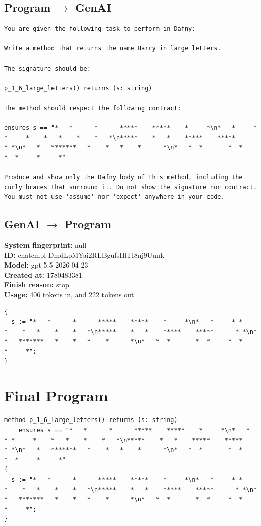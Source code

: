 \documentclass{article}
\begin{document}
\subsection*{Program $\rightarrow$ GenAI}
\begin{lstlisting}
You are given the following task to perform in Dafny:

Write a method that returns the name Harry in large letters.

The signature should be:

p_1_6_large_letters() returns (s: string)

The method should respect the following contract:

ensures s == "*   *      *      *****    *****    *     *\n*   *     * *     *    *   *    *    *   *\n*****    *   *    *****    *****      * *\n*   *   *******   *    *   *    *      *\n*   *  *       *  *     *  *     *     *"

Produce and show only the Dafny body of this method, including the curly braces that surround it. Do not show the signature nor contract. You must not use 'assume' nor 'expect' anywhere in your code.
\end{lstlisting}
\subsection*{GenAI $\rightarrow$ Program}
\textbf{System fingerprint: }null
\\\textbf{ID: }chatcmpl-DmdLpMYai2RLBgufsHlTI8nj9Uunk
\\\textbf{Model: }gpt-5.5-2026-04-23
\\\textbf{Created at: }1780483381
\\\textbf{Finish reason: }stop
\\\textbf{Usage: }406 tokens in, and 222 tokens out
\begin{lstlisting}
{
  s := "*   *      *      *****    *****    *     *\n*   *     * *     *    *   *    *    *   *\n*****    *   *    *****    *****      * *\n*   *   *******   *    *   *    *      *\n*   *  *       *  *     *  *     *     *";
}
\end{lstlisting}
\section*{Final Program}
\begin{lstlisting}
method p_1_6_large_letters() returns (s: string)
	ensures s == "*   *      *      *****    *****    *     *\n*   *     * *     *    *   *    *    *   *\n*****    *   *    *****    *****      * *\n*   *   *******   *    *   *    *      *\n*   *  *       *  *     *  *     *     *"
{
  s := "*   *      *      *****    *****    *     *\n*   *     * *     *    *   *    *    *   *\n*****    *   *    *****    *****      * *\n*   *   *******   *    *   *    *      *\n*   *  *       *  *     *  *     *     *";
}
\end{lstlisting}
\end{document}

